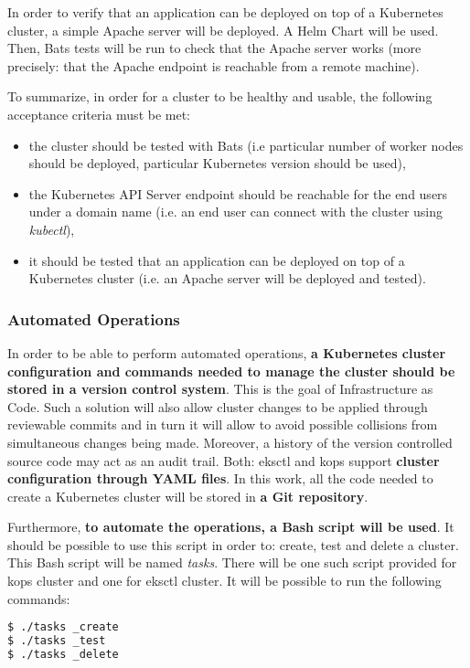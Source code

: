 In order to verify that an application can be deployed on top of a Kubernetes cluster, a simple Apache server will be deployed. A Helm Chart will be used\cite{helm-apache}. Then, Bats tests will be run to check that the Apache server works (more precisely: that the Apache endpoint is reachable from a remote machine).

To summarize, in order for a cluster to be healthy and usable, the following acceptance criteria must be met:
\begin{itemize}
\item the cluster should be tested with Bats (i.e particular number of worker nodes should be deployed, particular Kubernetes version should be used),
\item the Kubernetes API Server endpoint should be reachable for the end users under a domain name (i.e. an end user can connect with the cluster using \textit{kubectl}),
\item it should be tested that an application can be deployed on top of a Kubernetes cluster (i.e. an Apache server will be deployed and tested).
\end{itemize}

\subsubsection{Automated Operations}

In order to be able to perform automated operations, \textbf{a Kubernetes cluster configuration and commands needed to manage the cluster should be stored in a version control system}. This is the goal of Infrastructure as Code. Such a solution will also allow cluster changes to be applied through reviewable commits and in turn it will allow to avoid possible collisions from simultaneous changes being made. Moreover, a history of the version controlled source code may act as an audit trail\cite{online-kops-ci}\cite{online-kops-manifest}. Both: eksctl and kops support \textbf{cluster configuration through YAML files}. In this work, all the code needed to create a Kubernetes cluster will be stored in \textbf{a Git repository}.

Furthermore, \textbf{to automate the operations, a Bash script will be used}. It should be possible to use this script in order to: create, test and delete a cluster. This Bash script will be named \textit{tasks}. There will be one such script provided for kops cluster and one for eksctl cluster. It will be possible to run the following commands:
\begin{lstlisting}[basicstyle=\small,caption={Commands provided by tasks file - a Bash script which automates a Kubernetes cluster operations},captionpos=b,language=Bash,xleftmargin=1cm]
$ ./tasks _create
$ ./tasks _test
$ ./tasks _delete
\end{lstlisting}

